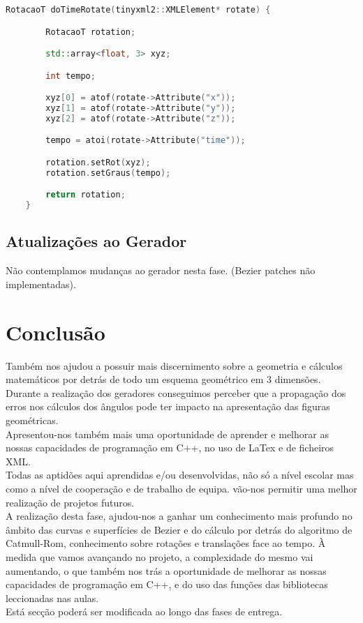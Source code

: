 \documentclass{article}
\begin{document}
\begin{file}
    \begin{lstlisting}[language=C++]
	RotacaoT doTimeRotate(tinyxml2::XMLElement* rotate) {

	    RotacaoT rotation;

	    std::array<float, 3> xyz;

	    int tempo;

	    xyz[0] = atof(rotate->Attribute("x"));
	    xyz[1] = atof(rotate->Attribute("y"));
	    xyz[2] = atof(rotate->Attribute("z"));

	    tempo = atoi(rotate->Attribute("time"));

	    rotation.setRot(xyz);
	    rotation.setGraus(tempo);

	    return rotation;
	}
    \end{lstlisting}
\end{file}

\subsection{Atualizações ao Gerador}
Não contemplamos mudanças ao gerador nesta fase. (Bezier patches não implementadas).

\newpage

\section{Conclusão}
Também nos ajudou a possuir mais discernimento sobre a geometria e cálculos matemáticos por detrás de todo um esquema geométrico em 3 dimensões.\\
Durante a realização dos geradores conseguimos perceber que a propagação dos erros nos cálculos dos ângulos pode ter impacto na apresentação das figuras geométricas.\\
Apresentou-nos também mais uma oportunidade de aprender e melhorar as nossas capacidades de programação em C++, no uso de LaTex e de ficheiros XML.\\
Todas as aptidões aqui aprendidas e/ou desenvolvidas, não só a nível escolar mas como a nível de cooperação e  de trabalho de equipa. vão-nos permitir uma melhor realização de projetos futuros.\\
A realização desta fase, ajudou-nos a ganhar um conhecimento mais profundo no âmbito das curvas e superfícies de Bezier e do cálculo por detrás do algoritmo de Catmull-Rom, conhecimento sobre rotações e translações face ao tempo. À medida que vamos avançando no projeto, a complexidade do mesmo vai aumentando, o que também nos trás a oportunidade de melhorar as nossas capacidades de programação em C++, e do uso das funções das bibliotecas leccionadas nas aulas.\\
Está secção poderá ser modificada ao longo das fases de entrega.\\
\end{document}
